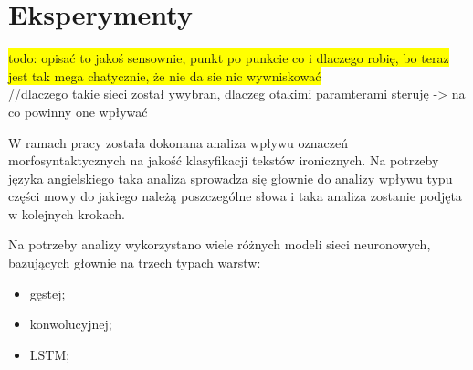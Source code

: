 \newpage %
\section{Eksperymenty}

\colorbox{yellow}{todo: opisać to jakoś sensownie, punkt po punkcie co i dlaczego robię, bo teraz jest tak mega chatycznie, że nie da sie nic wywniskować}\\

//dlaczego takie sieci został ywybran, dlaczeg otakimi paramterami steruję -> na co powinny one wpływać

W ramach pracy została dokonana analiza wpływu oznaczeń morfosyntaktycznych na jakość klasyfikacji tekstów ironicznych. Na potrzeby języka angielskiego taka analiza sprowadza się głownie do analizy wpływu typu części mowy do jakiego należą poszczególne słowa i taka analiza zostanie podjęta w kolejnych krokach.


Na potrzeby analizy wykorzystano wiele różnych modeli sieci neuronowych, bazujących głownie na trzech typach warstw:

\begin{itemize}
    \item gęstej;
    \item konwolucyjnej;
    \item LSTM;
\end{itemize}

